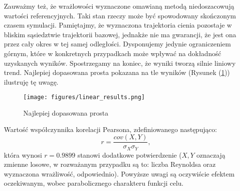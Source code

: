 \documentclass[12pt, twoside]{book}
\begin{document}
Zauważmy też, że wrażlowości wyznaczone omawianą metodą niedoszacowują wartości referencyjnych. Taki stan rzeczy może być spowodowany skończonym czasem symulacji. Pamiętajmy, że wyznaczona trajektoria cienia pozostaje w bliskim sąsiedztwie trajektorii bazowej, jednakże nie ma gwarancji, że jest ona przez cały okres w tej samej odległości. Dysponujemy jedynie ograniczeniem górnym, które w konkretnych przypadkach może wpływać na dokładność uzyskanych wyników. \newline
Spostrzegamy na koniec, że wyniki tworzą silnie liniowy trend. Najlepiej dopasowana prosta pokazana na tle wyników (Rysunek (\ref{Fig56})) ilustruję tę uwagę.
\begin{figure}[h]
	\texttt{[image: figures/linear\_results.png]} 
	\centering
	\caption{Najlepiej dopasowana prosta}
	\label{Fig56}
\end{figure}
Wartość współczynnika korelacji Pearsona, zdefiniowanego następująco:
\begin{equation}
r = \frac{cov(X,Y)}{\sigma_{X}\sigma_{Y}},
\end{equation}
która wynosi $ r = 0.9899 $ stanowi dodatkowe potwierdzenie ($ X, Y $ oznaczają zmienne losowe, w rozważanym przypadku są to: liczba Reynoldsa oraz wyznaczona wrażliwość, odpowiednio).\newline
Powyższe uwagi są oczywiście efektem oczekiwanym, wobec parabolicznego charakteru funkcji celu.\newline
\end{document}

